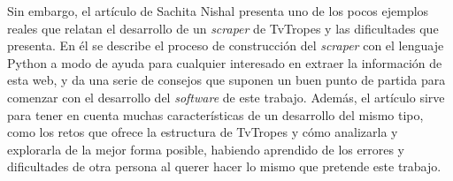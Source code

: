 Sin embargo, el artículo de Sachita Nishal \cite{nishalscraping} presenta uno de
los pocos ejemplos reales que relatan el desarrollo de un \textit{scraper} de
TvTropes y las dificultades que presenta. En él se describe el proceso de
construcción del \textit{scraper} con el lenguaje Python a modo de ayuda para
cualquier interesado en extraer la información de esta web, y da una serie de
consejos que suponen un buen punto de partida para comenzar con el desarrollo
del \textit{software} de este trabajo. Además, el artículo sirve para tener en
cuenta muchas características de un desarrollo del mismo tipo, como los retos
que ofrece la estructura de TvTropes y cómo analizarla y explorarla de la mejor
forma posible, habiendo aprendido de los errores y dificultades de otra persona
al querer hacer lo mismo que pretende este trabajo.

